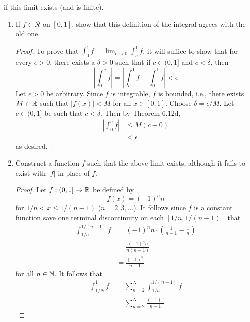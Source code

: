 \documentclass[../psets.tex]{subfiles}
\begin{document}
\begin{enumerate}[label={\textbf{\arabic*.}}]
    if this limit exists (and is finite).
    \begin{enumerate}
        \item If $f\in\mathscr{R}$ on $[0,1]$, show that this definition of the integral agrees with the old one.
        \begin{proof}
            To prove that $\int_0^1f=\lim_{c\to 0}\int_c^1f$, it will suffice to show that for every $\epsilon>0$, there exists a $\delta>0$ such that if $c\in(0,1]$ and $c<\delta$, then
            \begin{equation*}
                \left| \int_0^cf \right| = \left| \int_c^1f-\int_0^1f \right| < \epsilon
            \end{equation*}
            Let $\epsilon>0$ be arbitrary. Since $f$ is integrable, $f$ is bounded, i.e., there exists $M\in\mathbb{R}$ such that $|f(x)|<M$ for all $x\in[0,1]$. Choose $\delta=\epsilon/M$. Let $c\in(0,1]$ be such that $c<\delta$. Then by Theorem 6.12d, 
            \begin{align*}
                \left| \int_0^cf \right| &\leq M(c-0)\\
                &< \epsilon
            \end{align*}
            as desired.
        \end{proof}
        \item Construct a function $f$ such that the above limit exists, although it fails to exist with $|f|$ in place of $f$.
        \begin{proof}
            Let $f:(0,1]\to\mathbb{R}$ be defined by
            \begin{equation*}
                f(x) = (-1)^nn
            \end{equation*}
            for $1/n<x\leq 1/(n-1)$ ($n=2,3,\dots$). It follows since $f$ is a constant function save one terminal discontinuity on each $[1/n,1/(n-1)]$ that
            \begin{align*}
                \int_{1/n}^{1/(n-1)}f &= (-1)^nn\cdot\left( \frac{1}{n-1}-\frac{1}{n} \right)\\
                &= \frac{(-1)^nn}{n(n-1)}\\
                &= \frac{(-1)^n}{n-1}
            \end{align*}
            for all $n\in\mathbb{N}$. It follows that
            \begin{align*}
                \int_{1/N}^1f &= \sum_{n=2}^N\int_{1/n}^{1/(n-1)}f\\
                &= \sum_{n=2}^N\frac{(-1)^n}{n-1}
            \end{align*}

\end{proof}
\end{enumerate}
\end{enumerate}
\end{document}
